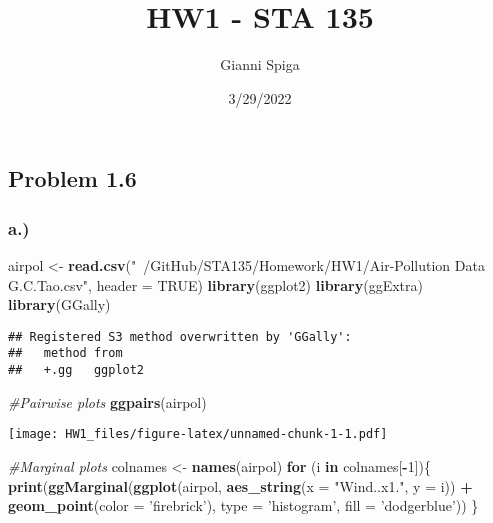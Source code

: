\documentclass[
]{article}
\title{HW1 - STA 135}
\author{Gianni Spiga}
\date{3/29/2022}
\newenvironment{Shaded}{\begin{snugshade}}{\end{snugshade}}
\newcommand{\CommentTok}[1]{\textcolor[rgb]{0.56,0.35,0.01}{\textit{#1}}}
\newcommand{\ControlFlowTok}[1]{\textcolor[rgb]{0.13,0.29,0.53}{\textbf{#1}}}
\newcommand{\DataTypeTok}[1]{\textcolor[rgb]{0.13,0.29,0.53}{#1}}
\newcommand{\DecValTok}[1]{\textcolor[rgb]{0.00,0.00,0.81}{#1}}
\newcommand{\KeywordTok}[1]{\textcolor[rgb]{0.13,0.29,0.53}{\textbf{#1}}}
\newcommand{\NormalTok}[1]{#1}
\newcommand{\OperatorTok}[1]{\textcolor[rgb]{0.81,0.36,0.00}{\textbf{#1}}}
\newcommand{\OtherTok}[1]{\textcolor[rgb]{0.56,0.35,0.01}{#1}}
\newcommand{\StringTok}[1]{\textcolor[rgb]{0.31,0.60,0.02}{#1}}
\begin{document}
\maketitle

\hypertarget{problem-1.6}{%
\subsection{Problem 1.6}\label{problem-1.6}}

\hypertarget{a.}{%
\subsubsection{a.)}\label{a.}}

\begin{Shaded}
\begin{Highlighting}[]
\NormalTok{airpol <-}
\StringTok{  }\KeywordTok{read.csv}\NormalTok{(}\StringTok{"~/GitHub/STA135/Homework/HW1/Air-Pollution Data G.C.Tao.csv"}\NormalTok{,}
           \DataTypeTok{header =} \OtherTok{TRUE}\NormalTok{)}
\KeywordTok{library}\NormalTok{(ggplot2)}
\KeywordTok{library}\NormalTok{(ggExtra)}
\KeywordTok{library}\NormalTok{(GGally)}
\end{Highlighting}
\end{Shaded}

\begin{verbatim}
## Registered S3 method overwritten by 'GGally':
##   method from   
##   +.gg   ggplot2
\end{verbatim}

\begin{Shaded}
\begin{Highlighting}[]
\CommentTok{#Pairwise plots}
\KeywordTok{ggpairs}\NormalTok{(airpol)}
\end{Highlighting}
\end{Shaded}

\texttt{[image: HW1\_files/figure-latex/unnamed-chunk-1-1.pdf]}

\begin{Shaded}
\begin{Highlighting}[]
\CommentTok{#Marginal plots}
\NormalTok{colnames <-}\StringTok{ }\KeywordTok{names}\NormalTok{(airpol)}
\ControlFlowTok{for}\NormalTok{ (i }\ControlFlowTok{in}\NormalTok{ colnames[}\OperatorTok{-}\DecValTok{1}\NormalTok{])\{}
  \KeywordTok{print}\NormalTok{(}\KeywordTok{ggMarginal}\NormalTok{(}\KeywordTok{ggplot}\NormalTok{(airpol, }\KeywordTok{aes_string}\NormalTok{(}\DataTypeTok{x =} \StringTok{"Wind..x1."}\NormalTok{, }\DataTypeTok{y =}\NormalTok{ i)) }\OperatorTok{+}\StringTok{ }\KeywordTok{geom_point}\NormalTok{(}\DataTypeTok{color =} \StringTok{'firebrick'}\NormalTok{), }\DataTypeTok{type =} \StringTok{'histogram'}\NormalTok{, }\DataTypeTok{fill =} \StringTok{'dodgerblue'}\NormalTok{))}
\NormalTok{\}}
\end{Highlighting}
\end{Shaded}
\end{document}
